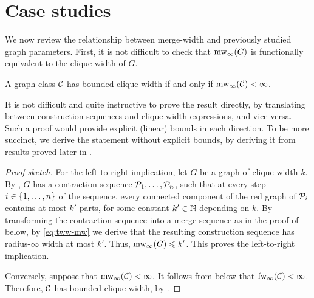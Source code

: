 



\section{Case studies}\label{sec:cases}
We now review the relationship between
merge-width and previously studied graph parameters.
First, it is not difficult to check that 
$\mw_\infty(G)$ is functionally equivalent to the clique-width of $G$. 
\begin{theorem}\label{thm:cw}
  A graph class $\CC$ has bounded clique-width if and only if $\mw_\infty(\CC)<\infty$.
\end{theorem}


    It is not difficult and quite instructive to prove the result directly,
    by translating between construction sequences and clique-width expressions, and vice-versa.
    Such a proof would provide explicit (linear) bounds in each direction.
    To be more succinct, we derive the statement without explicit bounds, by deriving it from results proved later in .

\begin{proof}[Proof sketch]

    For the left-to-right implication,
    let $G$ be a graph of clique-width $k$.
    By \cite[Thm. 1]{tww6}, $G$ has a contraction sequence $\cal P_1,\ldots,\cal P_n$, such that at every 
    step $i\in\set{1,\ldots,n}$ of the sequence,
    every connected component of the red graph of $\cal P_i$ contains 
    at most $k'$ parts, for some constant $k'\in\N$ depending on $k$.
    By transforming the contraction sequence into a merge sequence as in the proof of  below, by \eqref{eq:tww-mw} we derive that the resulting construction sequence has radius-$\infty$ width at most $k'$. Thus, $\mw_\infty(G)\le k'$.
    This proves the left-to-right implication.

    Conversely, suppose that $\mw_\infty(\CC)<\infty$.
    It follows from  below that $\fw_\infty(\CC)<\infty$.
    Therefore, $\CC$ has bounded clique-width, by \cite[Thm. II.6]{flip-width}.
\end{proof}

